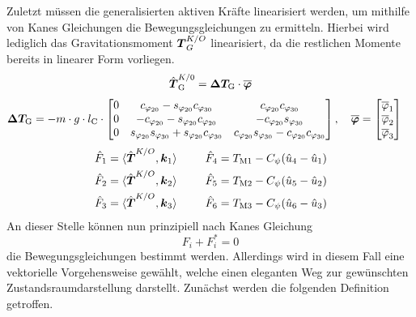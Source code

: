 Zuletzt müssen die generalisierten aktiven Kräfte linearisiert werden, um mithilfe von Kanes Gleichungen die Bewegungsgleichungen zu ermitteln. Hierbei wird lediglich das Gravitationsmoment $\boldsymbol{T}^{K/O}_G$ linearisiert, da die restlichen Momente bereits in linearer Form vorliegen.
\begin{align}
\hat{\boldsymbol{T}}^{K/0}_{\text{G}} = \boldsymbol{\Delta T_{\text{G}}} \cdot \boldsymbol{\overline{\varphi}}
\end{align}
\begin{align*}
\boldsymbol{\Delta T_{\text{G}}} = -m\cdot g\cdot l_{\text{C}}\cdot \begin{bmatrix}
0 & c_{\varphi_{\text{20}}}-s_{\varphi_{\text{20}}}c_{\varphi_{\text{30}}} & c_{\varphi_{\text{20}}}c_{\varphi_{\text{30}}} 
\\
0 & -c_{\varphi_{\text{20}}}-s_{\varphi_{\text{20}}}c_{\varphi_{\text{20}}} & -c_{\varphi_{\text{20}}}s_{\varphi_{\text{30}}} 
\\
0 & s_{\varphi_{\text{20}}}s_{\varphi_{\text{30}}}+s_{\varphi_{\text{20}}}c_{\varphi_{\text{30}}} & c_{\varphi_{\text{20}}}s_{\varphi_{\text{30}}}-c_{\varphi_{\text{20}}}c_{\varphi_{\text{30}}}
\end{bmatrix},\hspace{10pt}
\boldsymbol{\overline{\varphi}}&= \begin{bmatrix}
\overline{\varphi}_{\text{1}} \\ \overline{\varphi}_{\text{2}} \\ \overline{\varphi}_{\text{3}}
\end{bmatrix} \nonumber
\end{align*}
\begin{align}
\hat{F}_1 &= \langle {\hat{\boldsymbol{T}}^{K/O}}, {\boldsymbol{k}_{\text{1}}} \rangle &&\hspace{15pt}\hat{F}_{\text{4}} = T_{\text{M1}} - C_{\psi}(\hat{u}_{\text{4}} - \hat{u}_{\text{1}})
\\
\hat{F}_{\text{2}} &= \langle {\hat{\boldsymbol{T}}^{K/O}}, {\boldsymbol{k}_{\text{2}}} \rangle &&\hspace{15pt}\hat{F}_{\text{5}} = T_{\text{M2}} - C_{\psi}(\hat{u}_{\text{5}} - \hat{u}_{\text{2}})
\\
\hat{F}_{\text{3}} &= \langle {\hat{\boldsymbol{T}}^{K/O}}, {\boldsymbol{k}_{\text{3}}} \rangle &&\hspace{15pt}\hat{F}_{\text{6}} = T_{\text{M3}} - C_{\psi}(\hat{u}_{\text{6}} - \hat{u}_{\text{3}})
\end{align}
An dieser Stelle können nun prinzipiell nach Kanes Gleichung
\begin{equation}
F_i + F^*_i = 0
\end{equation}
die Bewegungsgleichungen bestimmt werden. Allerdings wird in diesem Fall eine vektorielle Vorgehensweise gewählt, welche einen eleganten Weg zur gewünschten Zustandsraumdarstellung darstellt. Zunächst werden die folgenden Definition getroffen.
